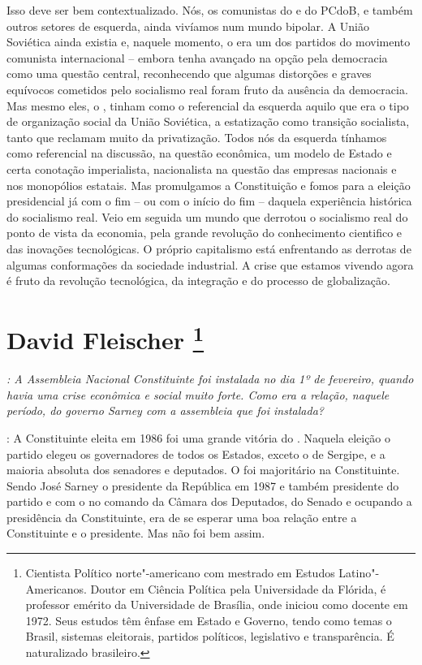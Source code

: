 Isso deve ser bem contextualizado. Nós, os comunistas
do  e do PCdoB, e também outros setores de esquerda, ainda vivíamos
num mundo bipolar. A União Soviética ainda existia e, naquele momento, o
 era um dos partidos do movimento comunista internacional -- embora
tenha avançado na opção pela democracia como uma questão central,
reconhecendo que algumas distorções e graves equívocos cometidos pelo
socialismo real foram fruto da ausência da democracia. Mas mesmo eles, o
, tinham como o referencial da esquerda aquilo que era o tipo de
organização social da União Soviética, a estatização como transição
socialista, tanto que reclamam muito da privatização. Todos nós da
esquerda tínhamos como referencial na discussão, na questão econômica,
um modelo de Estado e certa conotação imperialista, nacionalista na
questão das empresas nacionais e nos monopólios estatais. Mas
promulgamos a Constituição e fomos para a eleição presidencial já com o
fim -- ou com o início do fim -- daquela experiência histórica do
socialismo real. Veio em seguida um mundo que derrotou o socialismo real
do ponto de vista da economia, pela grande revolução do conhecimento
cientifico e das inovações tecnológicas. O próprio capitalismo está
enfrentando as derrotas de algumas conformações da sociedade industrial.
A crise que estamos vivendo agora é fruto da revolução tecnológica, da
integração e do processo de globalização.

\chapter{David Fleischer
\footnote{Cientista Político norte"-americano com mestrado em Estudos
Latino"-Americanos. Doutor em Ciência Política pela Universidade da
Flórida, é professor emérito da Universidade de Brasília, onde iniciou
como docente em 1972. Seus estudos têm ênfase em Estado e Governo, tendo
como temas o Brasil, sistemas eleitorais, partidos políticos,
legislativo e transparência. É naturalizado brasileiro.}}

\emph{: A Assembleia Nacional Constituinte foi instalada no dia 1º de
fevereiro, quando havia uma crise econômica e social muito forte. Como
era a relação, naquele período, do governo Sarney com a assembleia que
foi instalada?}

: A Constituinte eleita em 1986 foi uma grande vitória
do . Naquela eleição o partido elegeu os governadores de todos os
Estados, exceto o de Sergipe, e a maioria absoluta dos senadores e
deputados. O  foi majoritário na Constituinte. Sendo José Sarney o
presidente da República em 1987 e também presidente do partido e com o
 no comando da Câmara dos Deputados, do Senado e ocupando a
presidência da Constituinte, era de se esperar uma boa relação entre a
Constituinte e o presidente. Mas não foi bem assim.

